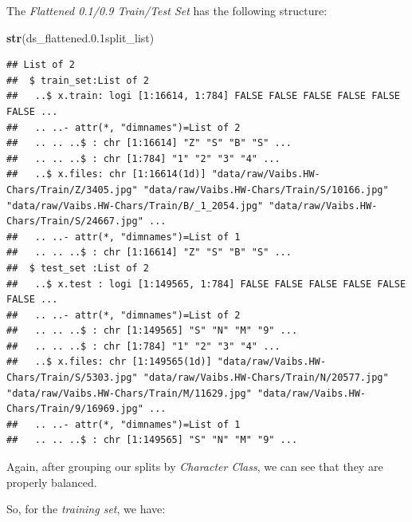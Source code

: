\documentclass[
]{report}
\newenvironment{Shaded}{\begin{snugshade}}{\end{snugshade}}
\newcommand{\AttributeTok}[1]{\textcolor[rgb]{0.13,0.29,0.53}{#1}}
\newcommand{\FloatTok}[1]{\textcolor[rgb]{0.00,0.00,0.81}{#1}}
\newcommand{\FunctionTok}[1]{\textcolor[rgb]{0.13,0.29,0.53}{\textbf{#1}}}
\newcommand{\NormalTok}[1]{#1}
\newcommand{\SpecialCharTok}[1]{\textcolor[rgb]{0.81,0.36,0.00}{\textbf{#1}}}
\begin{document}
The \emph{Flattened 0.1/0.9 Train/Test Set} has the following structure:

\begin{Shaded}
\begin{Highlighting}[]
\FunctionTok{str}\NormalTok{(ds\_flattened.}\FloatTok{0.1}\NormalTok{split\_list)}
\end{Highlighting}
\end{Shaded}

\begin{verbatim}
## List of 2
##  $ train_set:List of 2
##   ..$ x.train: logi [1:16614, 1:784] FALSE FALSE FALSE FALSE FALSE FALSE ...
##   .. ..- attr(*, "dimnames")=List of 2
##   .. .. ..$ : chr [1:16614] "Z" "S" "B" "S" ...
##   .. .. ..$ : chr [1:784] "1" "2" "3" "4" ...
##   ..$ x.files: chr [1:16614(1d)] "data/raw/Vaibs.HW-Chars/Train/Z/3405.jpg" "data/raw/Vaibs.HW-Chars/Train/S/10166.jpg" "data/raw/Vaibs.HW-Chars/Train/B/_1_2054.jpg" "data/raw/Vaibs.HW-Chars/Train/S/24667.jpg" ...
##   .. ..- attr(*, "dimnames")=List of 1
##   .. .. ..$ : chr [1:16614] "Z" "S" "B" "S" ...
##  $ test_set :List of 2
##   ..$ x.test : logi [1:149565, 1:784] FALSE FALSE FALSE FALSE FALSE FALSE ...
##   .. ..- attr(*, "dimnames")=List of 2
##   .. .. ..$ : chr [1:149565] "S" "N" "M" "9" ...
##   .. .. ..$ : chr [1:784] "1" "2" "3" "4" ...
##   ..$ x.files: chr [1:149565(1d)] "data/raw/Vaibs.HW-Chars/Train/S/5303.jpg" "data/raw/Vaibs.HW-Chars/Train/N/20577.jpg" "data/raw/Vaibs.HW-Chars/Train/M/11629.jpg" "data/raw/Vaibs.HW-Chars/Train/9/16969.jpg" ...
##   .. ..- attr(*, "dimnames")=List of 1
##   .. .. ..$ : chr [1:149565] "S" "N" "M" "9" ...
\end{verbatim}

Again, after grouping our splits by \emph{Character Class}, we can see that they are properly balanced.

\newpage

So, for the \emph{training set}, we have:

\begin{Shaded}
\end{Shaded}

\footnotesize
\end{document}
